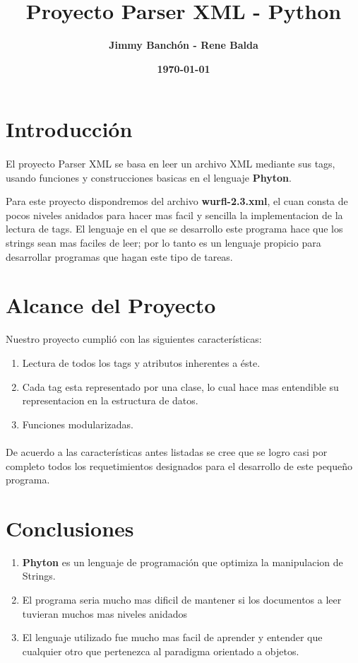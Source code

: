 \documentclass[11pt]{article}
\title{\textbf{Proyecto Parser XML - Python}}
\author{\textbf{Jimmy Banchón - Rene Balda}}
\date{\textbf{\today}}
\begin{document}


\maketitle
\section{\textbf{Introducción}} 
\paragraph{} \noindent
El proyecto Parser XML se basa en leer un archivo XML mediante sus tags, usando funciones y construcciones basicas en el lenguaje {\textbf{Phyton}}.

Para este proyecto dispondremos del archivo {\textbf{wurfl-2.3.xml}}, el cuan consta de pocos niveles anidados para hacer mas facil y sencilla la implementacion de la lectura de tags. El lenguaje en el que se desarrollo este programa hace que los strings sean mas faciles de leer; por lo tanto es un lenguaje propicio para desarrollar programas que hagan este tipo de tareas.
\section{\textbf{Alcance del Proyecto}}

Nuestro proyecto cumplió con las siguientes características:
\begin{enumerate}
\item 
Lectura de todos los tags y atributos inherentes a éste.

\item
Cada tag esta representado por una clase, lo cual hace mas entendible su representacion en la estructura de datos.

\item
Funciones modularizadas.

\end{enumerate}
\paragraph{} \noindent De acuerdo a las características antes listadas se cree que se logro casi por completo todos los requetimientos designados para el desarrollo de este pequeño programa.

\section{\textbf{Conclusiones}}
\begin{enumerate}
\item
{\textbf{Phyton}} es un lenguaje de programación que optimiza la manipulacion de Strings.
\item
El programa seria mucho mas dificil de mantener si los documentos a leer tuvieran muchos mas niveles anidados
\item
El lenguaje utilizado fue mucho mas facil de aprender y entender que cualquier otro que pertenezca al paradigma orientado a objetos.

\end{enumerate}
\end{document}
